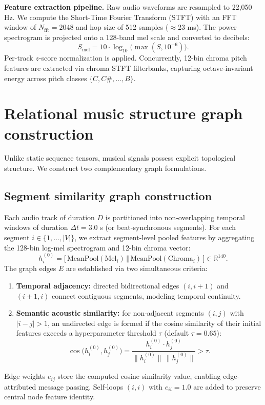\documentclass[10pt]{article}
\begin{document}
\textbf{Feature extraction pipeline.} Raw audio waveforms are resampled to 22{,}050 Hz. We compute the Short-Time Fourier Transform (STFT) with an FFT window of $N_{\text{fft}} = 2048$ and hop size of 512 samples ($\approx$23 ms). The power spectrogram is projected onto a 128-band mel scale and converted to decibels:
\begin{equation}
  S_{\text{mel}} = 10 \cdot \log_{10}\!\big(\max(S, 10^{-6})\big).
\end{equation}
Per-track $z$-score normalization is applied. Concurrently, 12-bin chroma pitch features are extracted via chroma STFT filterbanks, capturing octave-invariant energy across pitch classes $\{C, C\#, \ldots, B\}$.

\section{Relational music structure graph construction}

Unlike static sequence tensors, musical signals possess explicit topological structure. We construct two complementary graph formulations.

\subsection{Segment similarity graph construction}

Each audio track of duration $D$ is partitioned into non-overlapping temporal windows of duration $\Delta t = 3.0$ s (or beat-synchronous segments). For each segment $i \in \{1, \ldots, |V|\}$, we extract segment-level pooled features by aggregating the 128-bin log-mel spectrogram and 12-bin chroma vector:
\begin{equation}
  h_i^{(0)} = \big[\, \text{MeanPool}(\text{Mel}_i) \,\Vert\, \text{MeanPool}(\text{Chroma}_i) \,\big] \in \mathbb{R}^{140}.
\end{equation}
The graph edges $E$ are established via two simultaneous criteria:
\begin{enumerate}[nosep]
  \item \textbf{Temporal adjacency:} directed bidirectional edges $(i, i{+}1)$ and $(i{+}1, i)$ connect contiguous segments, modeling temporal continuity.
  \item \textbf{Semantic acoustic similarity:} for non-adjacent segments $(i, j)$ with $|i-j| > 1$, an undirected edge is formed if the cosine similarity of their initial features exceeds a hyperparameter threshold $\tau$ (default $\tau = 0.65$):
  \begin{equation}
    \cos\!\big(h_i^{(0)}, h_j^{(0)}\big) = \frac{h_i^{(0)} \cdot h_j^{(0)}}{\lVert h_i^{(0)} \rVert \, \lVert h_j^{(0)} \rVert} > \tau.
  \end{equation}
\end{enumerate}
Edge weights $e_{ij}$ store the computed cosine similarity value, enabling edge-attributed message passing. Self-loops $(i,i)$ with $e_{ii} = 1.0$ are added to preserve central node feature identity.
\end{document}
